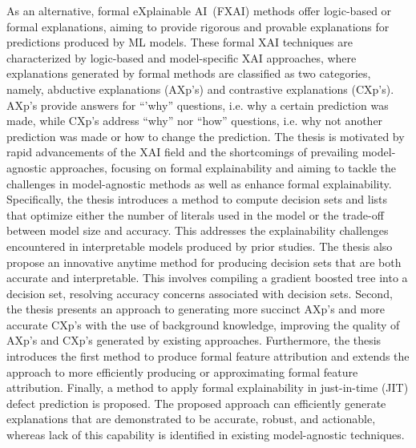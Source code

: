 As an alternative, formal eXplainable AI~(FXAI) methods offer logic-based or formal explanations,
aiming to provide rigorous and provable explanations for predictions produced by ML models.
%
These formal XAI techniques are characterized by logic-based and model-specific XAI approaches,
where explanations generated by formal methods are classified as two categories, namely, abductive explanations (AXp's) and
contrastive explanations (CXp's).
%
AXp's provide answers for ``'why'' questions, i.e. why a certain prediction was made, 
while CXp's address ``why'' nor ``how'' questions, i.e. why not another prediction was made or
how to change the prediction.
%
The thesis is motivated by rapid advancements of the XAI field and the shortcomings 
of prevailing model-agnostic approaches, focusing on formal explainability
and aiming to tackle the challenges in model-agnostic methods as well
as enhance formal explainability.
%
Specifically, the thesis introduces a method to compute decision sets and lists that optimize either 
the number of literals used in the model or the trade-off between model size and accuracy.
%
This addresses the explainability challenges encountered in interpretable models 
produced by prior studies.
%
The thesis also propose an innovative anytime method for producing decision sets
that are both accurate and interpretable.
%
This involves compiling a gradient boosted tree into a decision set, 
resolving accuracy concerns associated with decision sets.
%
Second, the thesis presents an approach to generating more succinct AXp's and more accurate CXp's 
with the use of background knowledge, improving the quality of AXp's and CXp's generated by
existing approaches.
%
Furthermore, the thesis introduces the first method to produce formal feature attribution 
and extends the approach to more efficiently producing or approximating formal feature
attribution.
%
Finally, a method to apply formal explainability in just-in-time (JIT) defect prediction is proposed.
%
The proposed approach can efficiently generate explanations that are demonstrated
to be accurate, robust, and actionable, whereas lack of this capability is 
identified in existing model-agnostic techniques.






% 


